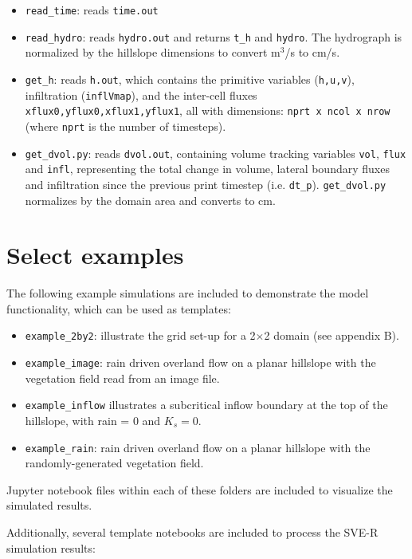 \documentclass{article}
\newcommand{\code}[1]{\texttt{#1}}
\begin{document}
\begin{itemize}
	\item \code{read\_time}: reads \code{time.out}
	\item \code{read\_hydro}: reads \code{hydro.out} and returns \code{t\_h} and \code{hydro}. The hydrograph is normalized by the hillslope dimensions to convert m$^3$/s to cm/s.
	\item \code{get\_h}: reads \code{h.out}, which contains the primitive variables (\code{h,u,v}), infiltration  (\code{inflVmap}), and the inter-cell fluxes \code{xflux0,yflux0,xflux1,yflux1}, all with dimensions: \code{nprt x ncol x nrow} (where \code{nprt} is the number of timesteps).
	\item \code{get\_dvol.py}: reads \code{dvol.out}, containing volume tracking variables  \code{vol},  \code{flux} and  \code{infl}, representing the total change in volume, lateral boundary fluxes and infiltration since the previous print timestep (i.e. \code{dt\_p}). \code{get\_dvol.py} normalizes by the domain area and converts to cm. 
\end{itemize}

 

	
\section{Select examples}	
\label{select_examples}

The following example simulations are included to demonstrate the model functionality, which can be used as templates:
\begin{itemize}
	\item \code{example\_2by2}: illustrate the grid set-up for a 2$\times$2 domain (see appendix B).
	\item  \code{example\_image}: rain driven overland flow on a planar hillslope with the vegetation field read from an image file.
	\item \code{example\_inflow} illustrates a subcritical inflow boundary at the top of the hillslope, with rain = 0 and $K_s=0$.
	\item \code{example\_rain}:  rain driven overland flow on a planar hillslope with the randomly-generated vegetation field.
\end{itemize}

Jupyter notebook files within each of these folders are included to visualize the simulated results.

Additionally, several template notebooks are included to process the SVE-R simulation results:
\end{document}

